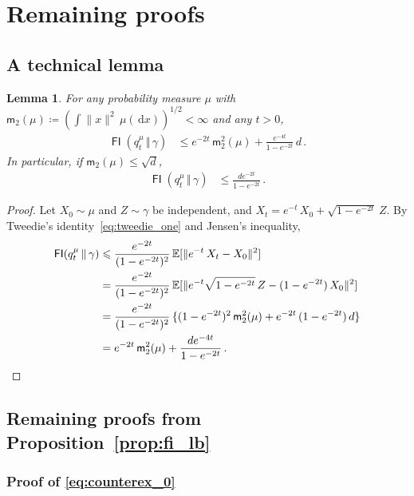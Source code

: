 \documentclass[12pt]{article}
\newcommand{\E}{\mathbb{E}}
\newcommand{\1}{\mathds{1}}
\newcommand*{\defeq}{\coloneqq}
\newcommand*{\rd}{\mathrm{d}}
\newcommand*{\dd}{\, \rd}
\newcommand{\mmid}{\,\Vert\,}
\DeclareMathOperator*{\FI}{\mathsf{FI}}
\renewcommand{\le}{\leqslant}
\newcommand{\mom}{\mathsf m_2}
\theoremstyle{plain}
\newtheorem{lemma}[theorem]{Lemma}
\theoremstyle{definition}
\theoremstyle{remark}
\begin{document}
\section{Remaining proofs}
\subsection{A technical lemma}
\begin{lemma}\label{lem:FI_abs_bound}
    For any probability measure $\mu$ with $\mom(\mu) \defeq (\int \|x\|^2\,\mu(\!\dd x))^{1/2} < \infty$ and any $t > 0$,
    \begin{align*}
        \FI(q_t^\mu\mmid \gamma)
        &\le e^{-2t}\,\mom^2(\mu) + \frac{e^{-4t}}{1-e^{-2t}}\,d\,.
    \end{align*}
    In particular, if $\mom(\mu) \le \sqrt d$,
    \begin{align*}
        \FI(q_t^\mu\mmid \gamma)
        &\le \frac{de^{-2t}}{1-e^{-2t}}\,.
    \end{align*}
\end{lemma}
\begin{proof}
    Let $X_0 \sim \mu$ and $Z \sim \gamma$ be independent, and $X_t = e^{-t}\,X_0 + \sqrt{1-e^{-2t}}\,Z$.
    By Tweedie's identity~\eqref{eq:tweedie_one}
    and Jensen's inequality,
    \begin{align*}
        \FI(q_t^\mu\mmid\gamma)
        &\le \frac{e^{-2t}}{(1-e^{-2t})^2}\, \E[\|e^{-t}\,X_t - X_0 \|^2] \\
        &= \frac{e^{-2t}}{(1-e^{-2t})^2}\, \E[\|e^{-t}\sqrt{1-e^{-2t}}\,Z - (1-e^{-2t})\, X_0 \|^2] \\
        &= \frac{e^{-2t}}{(1-e^{-2t})^2}\,\{(1-e^{-2t})^2\,\mom^2(\mu) + e^{-2t}\,(1-e^{-2t})\,d\} \\
        &= e^{-2t}\,\mom^2(\mu) + \frac{de^{-4t}}{1-e^{-2t}}\,. \qedhere
    \end{align*}
\end{proof}


\subsection{Remaining proofs from Proposition~\ref{prop:fi_lb}}\label{app:fi_lb_proof}


\subsubsection{Proof of \texorpdfstring{\eqref{eq:counterex_0}}{the first estimate}}
\end{document}
